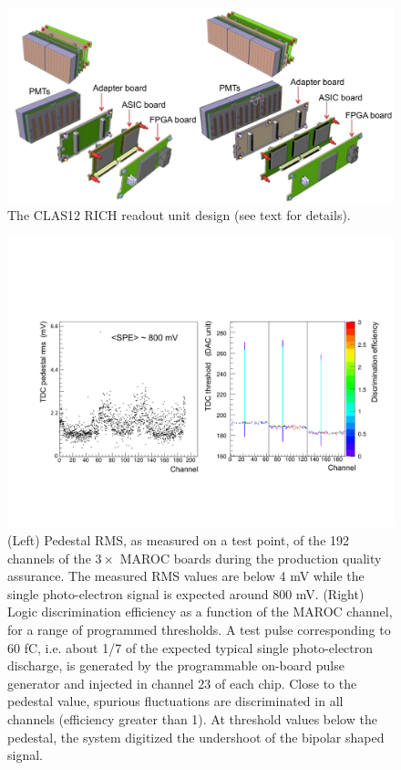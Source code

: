 \documentclass[final,5p,times,twocolumn]{elsarticle}
\begin{document}
\begin{figure}[t]
\begin{center}
\includegraphics[width=1.00\columnwidth]{EPS/TileAssembly.pdf}
\end{center}
\caption{The CLAS12 RICH readout unit design (see text for details).}
\label{fig:EleTile}
\end{figure}

\begin{figure}[t]
\begin{center}
\includegraphics[width=1.0\columnwidth]{EPS/Figure2.pdf}
\end{center}
\caption{(Left) Pedestal RMS, as measured on a test point, of the 192 channels of
the $3\times$ MAROC boards
during the production quality assurance. The measured RMS values are below 4 mV while
the single photo-electron signal is expected around 800 mV. (Right) Logic discrimination efficiency
as a function of the MAROC channel, for a range of programmed thresholds. A test pulse
corresponding to 60 fC, i.e. about 1/7 of the expected typical single photo-electron discharge,
is generated by the programmable on-board pulse generator and injected in channel 23 of each chip.
Close to the pedestal value, spurious fluctuations are discriminated in all channels (efficiency
greater than 1). At threshold values below the pedestal, the system digitized the undershoot of the
bipolar shaped signal.}
\label{Fig:pedquality}
\end{figure}
\end{document}
